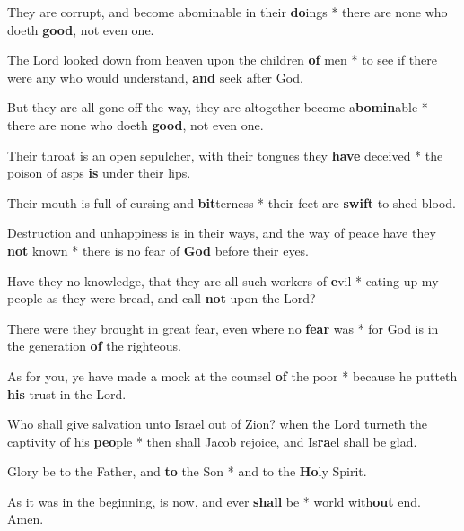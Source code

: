 \begin{multicols}{2}
	They are corrupt, and become abominable in their \textbf{do}ings * there are none who doeth \textbf{good}, not even one.
	
	The Lord looked down from heaven upon the children \textbf{of} men * to see if there were any who would understand, \textbf{and} seek after God.
	
	But they are all gone off the way, they are altogether become a\textbf{bomin}able * there are none who doeth \textbf{good}, not even one.
	
	Their throat is an open sepulcher, with their tongues they \textbf{have} deceived * the poison of asps \textbf{is} under their lips.
	
	Their mouth is full of cursing and \textbf{bit}terness * their feet are \textbf{swift} to shed blood.
	
	Destruction and unhappiness is in their ways, and the way of peace have they \textbf{not} known * there is no fear of \textbf{God} before their eyes.
	
	Have they no knowledge, that they are all such workers of \textbf{e}vil * eating up my people as they were bread, and call \textbf{not} upon the Lord?
	
	There were they brought in great fear, even where no \textbf{fear} was * for God is in the generation \textbf{of} the righteous.
	
	As for you, ye have made a mock at the counsel \textbf{of} the poor * because he putteth \textbf{his} trust in the Lord.
	
	Who shall give salvation unto Israel out of Zion? when the Lord turneth the captivity of his \textbf{peo}ple * then shall Jacob rejoice, and Is\textbf{ra}el shall be glad.
	
	Glory be to the Father, and \textbf{to} the Son * and to the \textbf{Ho}ly Spirit.
	
	As it was in the beginning, is now, and ever \textbf{shall} be * world with\textbf{out} end. Amen.
\end{multicols}